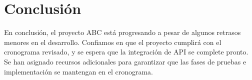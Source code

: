 \documentclass[12pt]{article}
\begin{document}
\section{Conclusión}
En conclusión, el proyecto ABC está progresando a pesar de algunos retrasos menores en el desarrollo. Confiamos en que el proyecto cumplirá con el cronograma revisado, y se espera que la integración de API se complete pronto. Se han asignado recursos adicionales para garantizar que las fases de pruebas e implementación se mantengan en el cronograma.
\end{document}
